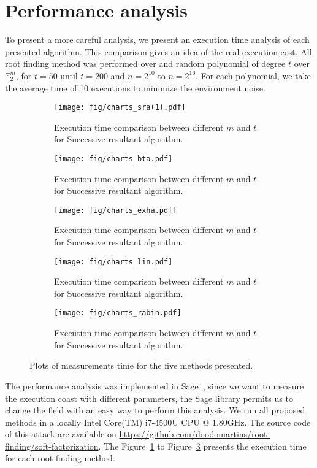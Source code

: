 \section{Performance analysis}
To present a more careful analysis, we present an execution time analysis of each presented algorithm. This comparison gives an idea of the real execution cost. All root finding method was performed over and random polynomial of degree $t$ over $\mathbb{F}_2^m$, for $t = 50$ until $t = 200$ and $n = 2^10$ to $n = 2^{16}$. For each polynomial, we take the average time of 10 executions to minimize the environment noise.
 

\begin{figure}[ht]
\centering
\begin{subfigure}{0.48\textwidth}
  \centering
  \texttt{[image: fig/charts\_sra(1).pdf]}
  \caption{Execution time comparison between different $m$ and $t$ for Successive resultant algorithm.}
  \label{fig:time-SRA}
\end{subfigure}
\begin{subfigure}{0.48\textwidth}
  \centering
  \texttt{[image: fig/charts\_bta.pdf]}
  \caption{Execution time comparison between different $m$ and $t$ for Successive resultant algorithm.}
  \label{fig:time-BTA}
\end{subfigure}
\begin{subfigure}{0.48\textwidth}
  \centering
  \texttt{[image: fig/charts\_exha.pdf]}
  \caption{Execution time comparison between different $m$ and $t$ for Successive resultant algorithm.}
  \label{fig:time-EXHA}
\end{subfigure}
\begin{subfigure}{0.48\textwidth}
  \centering
  \texttt{[image: fig/charts\_lin.pdf]}
  \caption{Execution time comparison between different $m$ and $t$ for Successive resultant algorithm.}
  \label{fig:time-LIN}
\end{subfigure}
\begin{subfigure}{0.48\textwidth}
  \centering
  \texttt{[image: fig/charts\_rabin.pdf]}
  \caption{Execution time comparison between different $m$ and $t$ for Successive resultant algorithm.}
  \label{fig:time-rabin}
\end{subfigure}

\caption{Plots of measurements time for the five methods presented.}
\label{fig:graph}
\end{figure}

The performance analysis was implemented in Sage~\cite{sage}, since we want to measure the execution coast with different parameters, the Sage library permits us to change the field with an easy way to perform this analysis. We run all proposed methods in a locally Intel\textsuperscript{\tiny\textregistered} Core(TM) i$7$-$4500$U CPU @ $1.80$GHz. The source code of this attack are available on \url{https://github.com/doodomartins/root-finding/soft-factorization}. The Figure~\ref{fig:time-SRA} to Figure~\ref{fig:time-EXHA} presents the execution time for each root finding method.

